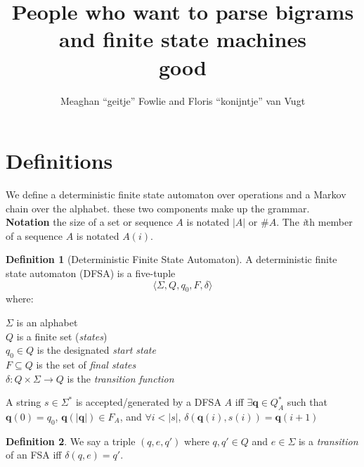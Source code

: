 \documentclass[12pt]{article}
\title{People who want to parse bigrams and finite state machines\\good}
\author{Meaghan ``geitje'' Fowlie and Floris ``konijntje'' van Vugt}
\theoremstyle{definition}
\newtheorem{definition}{Definition}[section]
\begin{document}
\maketitle

\section{Definitions}

\newcommand\STATES{\ensuremath{\mathbb{S}}}
\newcommand\OPS{\ensuremath{\mathbb{O}}}
\newcommand\BIGR{\ensuremath{\mathbb{B}}}
\newcommand\FSA{\textsc{FSA}}
\newcommand\PARSES{\ensuremath{\mathbb{P}}}
\newcommand\SC{\textsc{SC}}
\newcommand\TC{\textsc{TC}}
\newcommand\UC{\textsc{UC}}
\newcommand\BC{\textsc{BC}}
\newcommand\N{\ensuremath{\mathbb{N}}}
\newcommand\sg{\ensuremath{\Sigma}}
\newcommand\la{\ensuremath{\langle}}
\newcommand\ra{\ensuremath{\rangle}}
\newcommand\arr{\ensuremath{\rightarrow}}


We define a deterministic finite state automaton over operations and a Markov chain over the alphabet. these two components make up the grammar. \\

\noindent\textbf{Notation} the size of a set or sequence $A$ is notated $|A|$ or $\#A$. The \textit{i}th member of a sequence $A$ is notated $A(i)$.

\begin{definition}[Deterministic Finite State Automaton]
  A deterministic finite state automaton (DFSA) is a five-tuple 
\[\la \sg, Q, q_0, F, \delta  \ra  \]
where:

\noindent $\sg$ is an alphabet\\
$Q$ is a finite set (\textit{states})\\
$q_0\in Q$ is the designated \textit{start state}\\
$F\subseteq Q$ is the set of \textit{final states}\\
$\delta: Q\times \sg \arr Q$ is the \textit{transition function} 

A string $s\in\sg^*$ is accepted/generated by a DFSA $A$ iff
$\exists \mathbf{q} \in Q_A^*$ such that $\mathbf{q}(0)=q_0$, $\mathbf{q}(|\mathbf{q}|)\in F_A$, and $\forall i<|s|$, $\delta(\mathbf{q}(i),s(i))=\mathbf{q}(i+1)$
\label{def:dfsa}
\end{definition}

\begin{definition}
  We say a triple $(q,e,q')$ where $q,q'\in Q$ and $e\in\sg$ is a \textit{transition} of an
  FSA iff $\delta(q,e)=q'$.
\end{definition}
\end{document}
